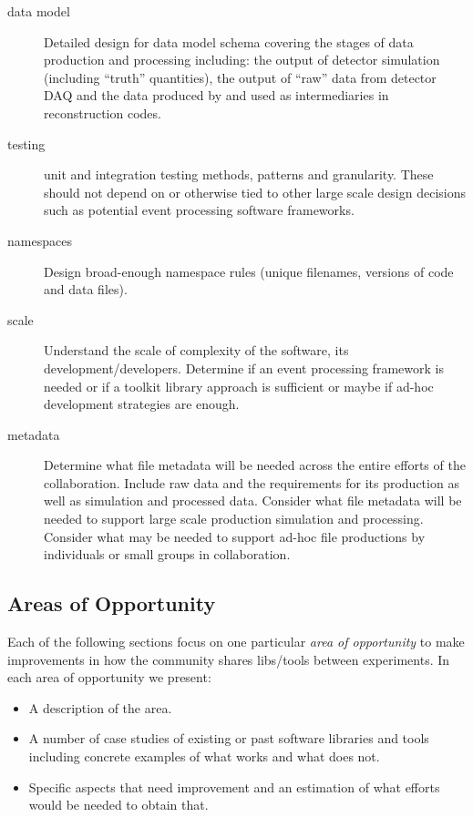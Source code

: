\begin{description}
\item[data model] Detailed design for data model schema covering the
  stages of data production and processing including: the output of
  detector simulation (including ``truth'' quantities), the output of
  ``raw'' data from detector DAQ and the data produced by and used as
  intermediaries in reconstruction codes.
\item[testing] unit and integration testing methods, patterns and
  granularity.  These should not depend on or otherwise tied to other
  large scale design decisions such as potential event processing
  software frameworks.  

\item[namespaces] Design broad-enough namespace rules (unique filenames, versions of code and data files).\\

\item[scale] Understand the scale of complexity of the software, its
  development/developers.  Determine if an event processing framework
  is needed or if a toolkit library approach is sufficient or maybe if
  ad-hoc development strategies are enough.

\item[metadata] Determine what file metadata will be needed across the
  entire efforts of the collaboration.  Include raw data and the
  requirements for its production as well as simulation and processed
  data.  Consider what file metadata will be needed to support large
  scale production simulation and processing.  Consider what may be
  needed to support ad-hoc file productions by individuals or small
  groups in collaboration.

\end{description}






\subsection{Areas of Opportunity}

Each of the following sections focus on one particular \textit{area of opportunity} to make improvements in how the community shares libs/tools between experiments.  In each area of opportunity we present:

\begin{itemize}
\item A description of the area.
\item A number of case studies of existing or past software libraries and tools including concrete examples of what works and what does not.
\item Specific aspects that need improvement and an estimation of what efforts would be needed to obtain that.
\end{itemize}
